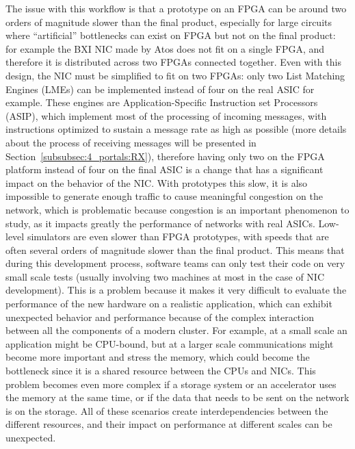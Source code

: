 The issue with this workflow is that a prototype on an FPGA can be around two
orders of magnitude slower than the final product, especially for large circuits
where ``artificial'' bottlenecks can exist on FPGA but not on the final product:
for example the BXI NIC made by Atos does not fit on a single FPGA, and
therefore it is distributed across two FPGAs connected together. Even with this
design, the NIC must be simplified to fit on two FPGAs: only two List Matching
Engines (LMEs) can be implemented instead of four on the real ASIC for example.
These engines are Application-Specific Instruction set Processors (ASIP), which
implement most of the processing of incoming messages, with instructions
optimized to sustain a message rate as high as possible (more details about the
process of receiving messages will be presented in
Section~\ref{subsubsec:4_portals:RX}), therefore having only two on the FPGA
platform instead of four on the final ASIC is a change that has a significant
impact on the behavior of the NIC. With prototypes this slow, it is also
impossible to generate enough traffic to cause meaningful congestion on the
network, which is problematic because congestion is an important phenomenon to
study, as it impacts greatly the performance of networks with real ASICs.
Low-level simulators are even slower than FPGA prototypes, with speeds that are
often several orders of magnitude slower than the final product. This means that
during this development process, software teams can only test their code on very
small scale tests (usually involving two machines at most in the case of NIC
development). This is a problem because it makes it very difficult to evaluate
the performance of the new hardware on a realistic application, which can
exhibit unexpected behavior and performance because of the complex interaction
between all the components of a modern cluster. For example, at a small scale an
application might be CPU-bound, but at a larger scale communications might
become more important and stress the memory, which could become the bottleneck
since it is a shared resource between the CPUs and NICs. This problem becomes
even more complex if a storage system or an accelerator uses the memory at the
same time, or if the data that needs to be sent on the network is on the
storage. All of these scenarios create interdependencies between the different
resources, and their impact on performance at different scales can be
unexpected.

